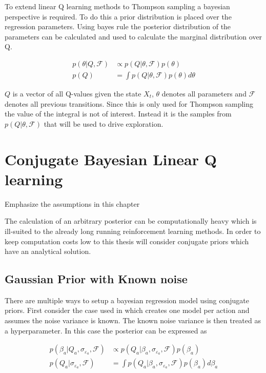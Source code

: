 To extend linear Q learning methods to Thompson sampling a bayesian perspective is required. To do this a prior distribution is placed over the regression parameters. Using bayes rule the posterior distribution of the parameters can be calculated and used to calculate the marginal distribution over Q.

\begin{align*}
p(\theta |Q, \mathcal{F}) &\propto p(Q| \theta, \mathcal{F})p(\theta) \\
p(Q) &= \int p(Q|\theta, \mathcal{F}) p(\theta) d\theta
\end{align*}

$Q$ is a vector of all Q-values given the state $X_t$, $\theta$ denotes all parameters and $\mathcal{F}$ denotes all previous transitions. Since this is only used for Thompson sampling the value of the integral is not of interest. Instead it is the samples from $p(Q|\theta, \mathcal{F})$ that will be used to drive exploration.

\section{Conjugate Bayesian Linear Q learning}


\todo Emphasize the assumptions in this chapter

The calculation of an arbitrary posterior can be computationally heavy which is ill-suited to the already long running reinforcement learning methods. In order to keep computation costs low to this thesis will consider conjugate priors which have an analytical solution.

\subsection{Gaussian Prior with Known noise}

There are multiple ways to setup a bayesian regression model using conjugate priors. First consider the case used in \cite{azziz_2018} which creates one model per action and assumes the noise variance is known. The known noise variance is then treated as a hyperparameter. In this case the posterior can be expressed as 

\begin{align*}
    p(\beta_a |Q_a, \sigma_{\varepsilon_a}, \mathcal{F}) &\propto p(Q_a| \beta_a, \sigma_{\varepsilon_a}, \mathcal{F})p(\beta_a) \\
    p(Q_a|\sigma_{\varepsilon_a}, \mathcal{F}) &= \int p(Q_a|\beta_a, \sigma_{\varepsilon_a}, \mathcal{F}) p(\beta_a)d\beta_a
\end{align*}

